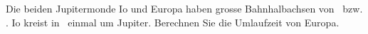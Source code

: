 Die beiden Jupitermonde Io und Europa haben grosse Bahnhalbachsen von \aIoO\ bzw. \aEuO. Io kreist in \TIoO\ einmal um Jupiter. Berechnen Sie die Umlaufzeit von Europa.
